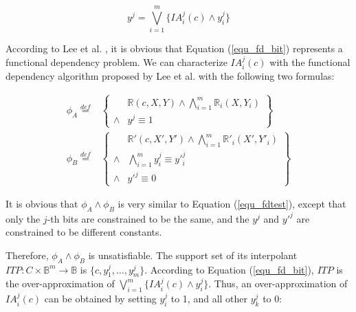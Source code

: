 \documentclass[journal]{IEEEtran}
\begin{document}
\begin{equation}\label{equ_fd_bit}
y^{j}=\bigvee _{i=1}^{m} \{IA^j_i(c)\wedge y^j_i\}
\end{equation}

According to Lee et al. \cite{funcdep},
it is obvious that Equation (\ref{equ_fd_bit}) represents a functional dependency problem.
We can characterize $IA^j_i(c)$ with the functional dependency algorithm proposed by Lee et al. \cite{funcdep} with the following two formulas:

\begin{equation}\label{equ_fdtestbitA}
\begin{split}
\phi_A \stackrel{def}{=} & \left\{
\begin{array}{cc}
      & \mathbb{R}(c,X,Y)\wedge \bigwedge_{i=1}^{m}\mathbb{R}_i(X,Y_i)  \\
\wedge& y^j\equiv 1
\end{array}
\right\}\\
\phi_B \stackrel{def}{=}&\left\{
\begin{array}{cc}
& \mathbb{R}'(c,X',Y') \wedge \bigwedge_{i=1}^{m}\mathbb{R}'_i(X',Y'_i)  \\
\wedge&\bigwedge_{i=1}^{m}y^j_i\equiv y'^j_i\\
\wedge& y'^j\equiv 0
\end{array}
\right\}
\end{split}
\end{equation}


It is obvious that $\phi_A\wedge \phi_B$ is very similar to Equation (\ref{equ_fdtest}),
except that only the $j$-th bits are constrained to be the same,
and the $y^j$ and $y'^j$ are constrained to be different constants.

Therefore,
$\phi_A\wedge \phi_B$ is unsatisfiable.
The support set of its interpolant $ITP:C\times\mathbb{B}^m\to \mathbb{B}$ is $\{c,y^j_1,\dots,y^j_m\}$.
According to Equation (\ref{equ_fd_bit}),
$ITP$ is the over-approximation of $\bigvee _{i=1}^{m} \{IA^j_i(c)\wedge y^j_i\}$.
Thus,
an over-approximation of $IA^j_i(c)$ can be obtained by setting $y^j_i$ to 1,
and all other $y^j_k$ to 0:
\end{document}
